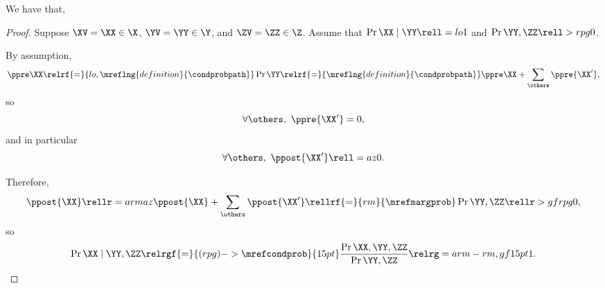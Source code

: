 \begin{proposition}
  We have that, %
\end{proposition}

\begin{proof}
  Suppose 
  $\XV = \XX \in \X$,
  $\YV = \YY \in \Y$, and
  $\ZV = \ZZ \in \Z$. Assume that $\Pr{\XX \mid \YY} \rell = lo 1$ and $\Pr{\YY, \ZZ} \rell > rpg 0$.

  By assumption,
  $$\ppre\XX \relrf{=}{lo,\mreflng{definition}{\condprobpath}} \Pr{\YY} 
  \relrf{=}{\mreflng{definition}{\condprobpath}} \ppre\XX + \sum_{\others}\ppre{\XX'},$$
    so
    $$\forall \others,\ \ppre{\XX'} = 0,$$
  and in particular
  $$\forall \others,\ \ppost{\XX'} \rell = az 0.$$

  Therefore, $$\ppost{\XX} \rellr = arm az \ppost{\XX} + \sum_{\others}\ppost{\XX'} 
  \rellrf{=}{rm}{\mrefmargprob} \Pr{\YY, \ZZ} \rellr > gf rpg 0,$$
  so $$\Pr{\XX \mid \YY, \ZZ} 
  \relrgf{=}{(rpg)->\mrefcondprob}{15pt} \frac{\Pr{\XX, \YY, \ZZ}}{\Pr{\YY, \ZZ}} 
  \relrg = arm-rm,gf 15pt 1.$$%
\end{proof}

